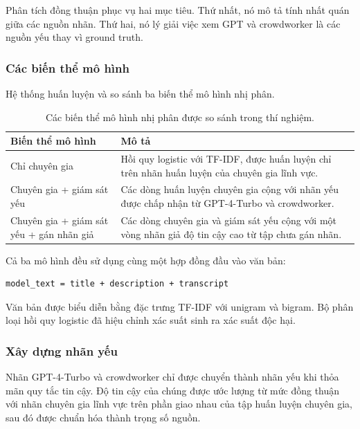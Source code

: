 Phân tích đồng thuận phục vụ hai mục tiêu. Thứ nhất, nó mô tả tính nhất quán giữa các nguồn nhãn. Thứ hai, nó lý giải việc xem GPT và crowdworker là các nguồn yếu thay vì ground truth.

\subsubsection{Các biến thể mô hình}

Hệ thống huấn luyện và so sánh ba biến thể mô hình nhị phân.

\begin{table}[H]
\centering
\small
\renewcommand{\arraystretch}{1.25}
\begin{tabularx}{\textwidth}{|>{\raggedright\arraybackslash}p{3.7cm}|>{\raggedright\arraybackslash}X|}
\hline
\textbf{Biến thể mô hình} & \textbf{Mô tả} \\
\hline
Chỉ chuyên gia & Hồi quy logistic với TF-IDF, được huấn luyện chỉ trên nhãn huấn luyện của chuyên gia lĩnh vực. \\
\hline
Chuyên gia + giám sát yếu & Các dòng huấn luyện chuyên gia cộng với nhãn yếu được chấp nhận từ GPT-4-Turbo và crowdworker. \\
\hline
Chuyên gia + giám sát yếu + gán nhãn giả & Các dòng chuyên gia và giám sát yếu cộng với một vòng nhãn giả độ tin cậy cao từ tập chưa gán nhãn. \\
\hline
\end{tabularx}
\caption{Các biến thể mô hình nhị phân được so sánh trong thí nghiệm.}
\label{tab:implementation-model-variants}
\end{table}

Cả ba mô hình đều sử dụng cùng một hợp đồng đầu vào văn bản:

\begin{verbatim}
model_text = title + description + transcript
\end{verbatim}

Văn bản được biểu diễn bằng đặc trưng TF-IDF với unigram và bigram. Bộ phân loại hồi quy logistic đã hiệu chỉnh xác suất sinh ra xác suất độc hại.

\subsubsection{Xây dựng nhãn yếu}

Nhãn GPT-4-Turbo và crowdworker chỉ được chuyển thành nhãn yếu khi thỏa mãn quy tắc tin cậy. Độ tin cậy của chúng được ước lượng từ mức đồng thuận với nhãn chuyên gia lĩnh vực trên phần giao nhau của tập huấn luyện chuyên gia, sau đó được chuẩn hóa thành trọng số nguồn.

